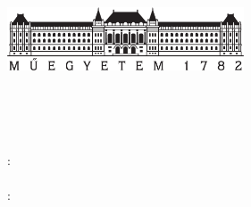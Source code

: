 \begin{titlepage}
  \begin{center}  
  \includegraphics[width=7cm]{./figures/bme_logo.pdf}
  \vspace{0.3cm}
  
  \bme \\
  \vik \\
  \viktanszek \\
  \vspace{5cm}
  
  \huge {\vikcim}
  \vspace{1.5cm}
  
  \large {\textbf{\tdk}}
  \vfill
    
  {\Large 
  	\keszitette: \\ \vspace{0.3cm}
  	\szerzo \\
  	\vspace{1.5cm}
  	\konzulens: \\ \vspace{0.3cm}
  	\vikkonzulensA \\
  }
  
  \vspace{2cm}
  \large {\tdkev}
 \end{center}
\end{titlepage}

